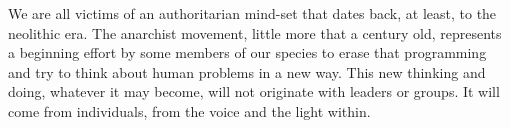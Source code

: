 We are all victims of an authoritarian mind-set that dates back, at least, to the neolithic era. The anarchist movement, little more that a century old, represents a beginning effort by some members of our species to erase that programming and try to think about human problems in a new way. This new thinking and doing, whatever it may become, will not originate with leaders or groups. It will come from individuals, from the voice and the light within.